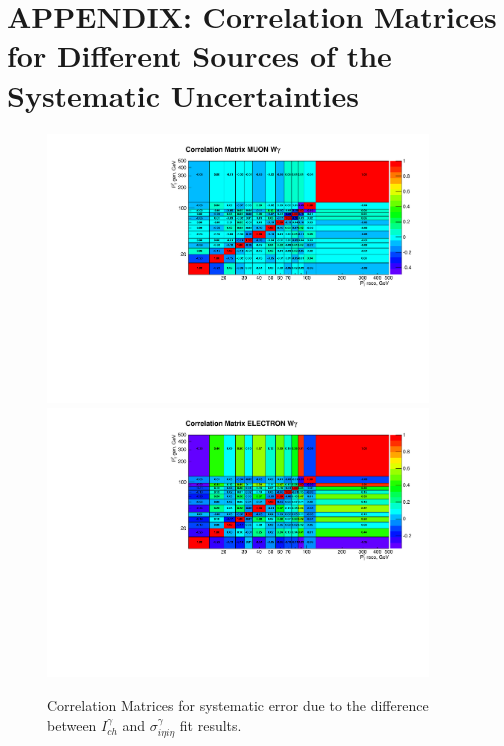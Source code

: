 \chapter{APPENDIX: Correlation Matrices for Different Sources of the Systematic Uncertainties}
\label{sec:corrMatrices}

\begin{figure}[htb]
  \begin{center}
   \includegraphics[width=0.90\textwidth]{../figs/figs_v11/MUON_WGamma/Constants/matrCorrelation_syst_CHISOvsSIHIH.pdf}\\
\includegraphics[width=0.90\textwidth]{../figs/figs_v11/ELECTRON_WGamma/Constants/matrCorrelation_syst_CHISOvsSIHIH.pdf}
  \caption{Correlation Matrices for systematic error due to the difference between $I_{ch}^{\gamma}$ and $\sigma_{i\eta i\eta}^{\gamma}$ fit results.}
  \label{fig:corrMatrices_syst_CHISOvsSIHIH_Wg}
  \end{center}
\end{figure}

